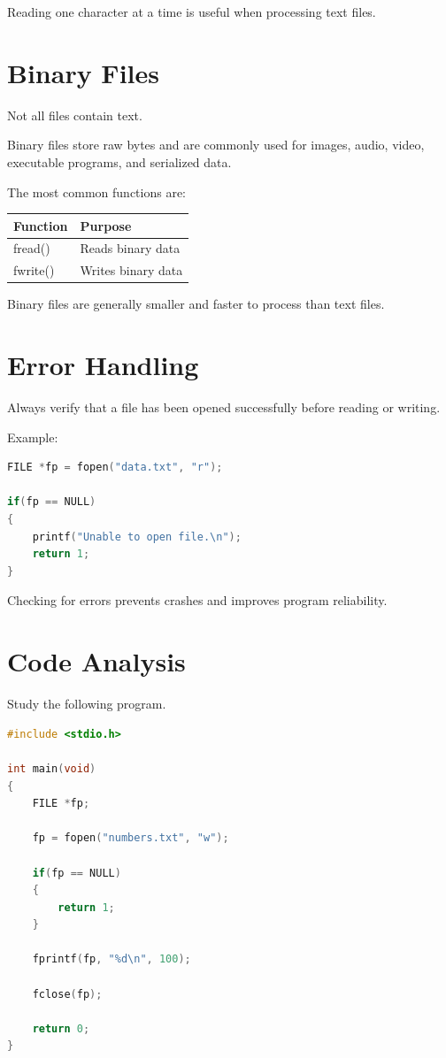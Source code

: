 \documentclass[12pt,openany]{book}
\begin{document}
Reading one character at a time is useful when processing text files.

\section{Binary Files}

Not all files contain text.

Binary files store raw bytes and are commonly used for images, audio, video, executable programs, and serialized data.

The most common functions are:

\begin{center}
\begin{tabular}{|l|l|}
\hline
Function & Purpose \\
\hline
fread() & Reads binary data \\
fwrite() & Writes binary data \\
\hline
\end{tabular}
\end{center}

Binary files are generally smaller and faster to process than text files.

\section{Error Handling}

Always verify that a file has been opened successfully before reading or writing.

Example:

\begin{lstlisting}[language=C]
FILE *fp = fopen("data.txt", "r");

if(fp == NULL)
{
    printf("Unable to open file.\n");
    return 1;
}
\end{lstlisting}

Checking for errors prevents crashes and improves program reliability.

\section{Code Analysis}

Study the following program.

\begin{lstlisting}[language=C]
#include <stdio.h>

int main(void)
{
    FILE *fp;

    fp = fopen("numbers.txt", "w");

    if(fp == NULL)
    {
        return 1;
    }

    fprintf(fp, "%d\n", 100);

    fclose(fp);

    return 0;
}
\end{lstlisting}
\end{document}
